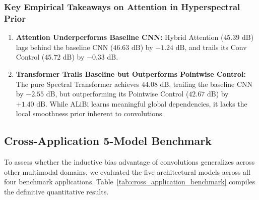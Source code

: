 \subsubsection{Key Empirical Takeaways on Attention in Hyperspectral Prior}
\begin{enumerate}[itemsep=1pt]
    \item \textbf{Attention Underperforms Baseline CNN:} Hybrid Attention ($45.39\text{ dB}$) lags behind the baseline CNN ($46.63\text{ dB}$) by \textbf{$-1.24\text{ dB}$}, and trails its Conv Control ($45.72\text{ dB}$) by \textbf{$-0.33\text{ dB}$}.
    \item \textbf{Transformer Trails Baseline but Outperforms Pointwise Control:} The pure Spectral Transformer achieves $44.08\text{ dB}$, trailing the baseline CNN by \textbf{$-2.55\text{ dB}$}, but outperforming its Pointwise Control ($42.67\text{ dB}$) by \textbf{$+1.40\text{ dB}$}. While ALiBi learns meaningful global dependencies, it lacks the local smoothness prior inherent to convolutions.
\end{enumerate}

\subsection{Cross-Application 5-Model Benchmark}
\label{subsec:cross_app_benchmark}
To assess whether the inductive bias advantage of convolutions generalizes across other multimodal domains, we evaluated the five architectural models across all four benchmark applications. Table~\ref{tab:cross_application_benchmark} compiles the definitive quantitative results.

